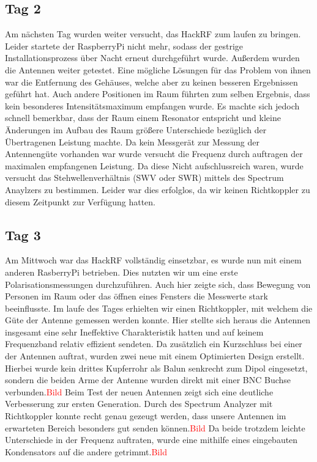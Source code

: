 \documentclass[titlepage,11pt,a4paper,ngerman]{article}
\begin{document}
\subsection{Tag 2}
Am nächsten Tag wurden weiter versucht, das HackRF zum laufen zu bringen. Leider startete der RaspberryPi nicht mehr, sodass der gestrige Installationsprozess über Nacht erneut durchgeführt wurde. Außerdem wurden die Antennen weiter getestet. Eine mögliche Lösungen für das Problem von ihnen war die Entfernung des Gehäuses, welche aber zu keinen besseren Ergebnissen geführt hat. Auch andere Positionen im Raum führten zum selben Ergebnis, dass kein besonderes Intensitätsmaximum empfangen wurde. Es machte sich jedoch schnell bemerkbar, dass der Raum einem Resonator entspricht und kleine Änderungen im Aufbau des Raum größere Unterschiede bezüglich der Übertragenen Leistung machte. Da kein Messgerät zur Messung der Antennengüte vorhanden war wurde versucht die Frequenz durch auftragen der maximalen empfangenen Leistung. Da diese Nicht aufschlussreich waren, wurde versucht das Stehwellenverhältnis (SWV oder SWR) mittels des Spectrum Anaylzers zu bestimmen. Leider war dies erfolglos, da wir keinen Richtkoppler zu diesem Zeitpunkt zur Verfügung hatten.
\subsection{Tag 3}
Am Mittwoch war das HackRF vollständig einsetzbar, es wurde nun mit einem anderen RasberryPi betrieben. Dies nutzten wir um eine erste Polarisationsmessungen durchzuführen. Auch hier zeigte sich, dass Bewegung von Personen im Raum oder das öffnen eines Fensters die Messwerte stark beeinflusste. Im laufe des Tages erhielten wir einen Richtkoppler, mit welchem die Güte der Antenne gemessen werden konnte. Hier stellte sich heraus die Antennen insgesamt eine sehr Ineffektive Charakteristik hatten und auf keinem Frequenzband relativ effizient sendeten. Da zusätzlich ein Kurzschluss bei einer der Antennen auftrat, wurden zwei neue mit einem Optimierten Design erstellt. Hierbei wurde kein drittes Kupferrohr als Balun senkrecht zum Dipol eingesetzt, sondern die beiden Arme der Antenne wurden direkt mit einer BNC Buchse verbunden.\textcolor{red}{Bild} Beim Test der neuen Antennen zeigt sich eine deutliche Verbesserung zur ersten Generation. Durch des Spectrum Analyzer mit Richtkoppler konnte recht genau gezeugt werden, dass unsere Antennen im erwarteten Bereich besonders gut senden können.\textcolor{red}{Bild} Da beide trotzdem leichte Unterschiede in der Frequenz auftraten, wurde eine mithilfe eines eingebauten Kondensators auf die andere getrimmt.\textcolor{red}{Bild} 
\end{document}

